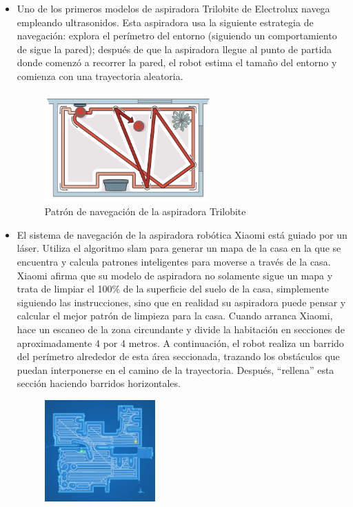 \begin{itemize}
\item Uno de los primeros modelos de aspiradora Trilobite de Electrolux navega empleando ultrasonidos. Esta aspiradora usa la siguiente estrategia de navegación: explora el perímetro del entorno (siguiendo un comportamiento de sigue la pared); después de que la aspiradora llegue al punto de partida donde comenzó a recorrer la pared, el robot estima el tamaño del entorno y comienza con una trayectoria aleatoria.
\begin{figure}[H]
  \begin{center}
    \includegraphics[width=0.6\textwidth]{figures/Vacuum/Trilobite.png}
		\caption{Patrón de navegación de la aspiradora Trilobite}
		\label{fig.Trilobite}
		\end{center}
\end{figure}
\item El sistema de navegación de la aspiradora robótica Xiaomi está guiado por un láser. Utiliza el algoritmo \acrfull{slam} para generar un mapa de la casa en la que se encuentra y calcula patrones inteligentes para moverse a través de la casa. Xiaomi afirma que su modelo de aspiradora no solamente sigue un mapa y trata de limpiar el 100\% de la superficie del suelo de la casa, simplemente siguiendo las instrucciones, sino que en realidad su aspiradora puede pensar y calcular el mejor patrón de limpieza para la casa.  Cuando arranca Xiaomi, hace un escaneo de la zona circundante y divide la habitación en secciones de aproximadamente 4 por 4 metros. A continuación, el robot realiza un barrido del perímetro alrededor de esta área seccionada, trazando los obstáculos que puedan interponerse en el camino de la trayectoria. Después, ``rellena'' esta sección haciendo barridos horizontales.
\begin{figure}[H]
  \begin{center}
    \includegraphics[width=0.4\textwidth]{figures/Vacuum/Xiaomi.png}

\end{center}
\end{figure}
\end{itemize}
